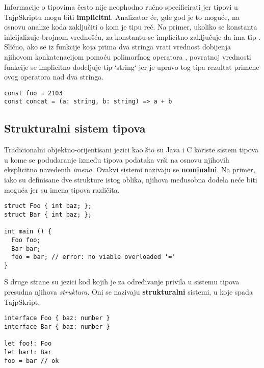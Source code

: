 Informacije o tipovima često nije neophodno ručno specificirati jer tipovi u TajpSkriptu mogu biti \textbf{implicitni}.
Analizator će, gde god je to moguće, na osnovu analize koda zaključiti o kom je tipu reč.
Na primer, ukoliko se konstanta inicijalizuje brojnom vrednošću, za konstantu se implicitno zaključuje da ima tip .
Slično, ako se iz funkcije koja prima dva stringa vrati vrednost dobijenja njihovom konkatenacijom pomoću polimorfnog operatora \code{+}, povratnoj vrednosti funkcije se implicitno dodeljuje tip `string` jer je upravo tog tipa rezultat primene ovog operatora nad dva stringa.

\begin{verbatim}
const foo = 2103
const concat = (a: string, b: string) => a + b
\end{verbatim}

\subsection{Strukturalni sistem tipova}

Tradicionalni objektno-orijentisani jezici kao što su Java i C koriste sistem tipova u kome se podudaranje između tipova podataka vrši na osnovu njihovih eksplicitno navedenih \textit{imena}.
Ovakvi sistemi nazivaju se \textbf{nominalni}.
Na primer, iako su definisane dve strukture istog oblika, njihova međusobna dodela neće biti moguća jer su imena tipova različita.

\begin{verbatim}
struct Foo { int baz; };
struct Bar { int baz; };

int main () {
  Foo foo;
  Bar bar;
  foo = bar; // error: no viable overloaded '='
}
\end{verbatim}

S druge strane su jezici kod kojih je za određivanje privila u sistemu tipova presudna njihova \textit{struktura}.
Oni se nazivaju \textbf{strukturalni} sistemi, u koje spada TajpSkript.

\begin{verbatim}
interface Foo { baz: number }
interface Bar { baz: number }

let foo!: Foo
let bar!: Bar
foo = bar // ok
\end{verbatim}
